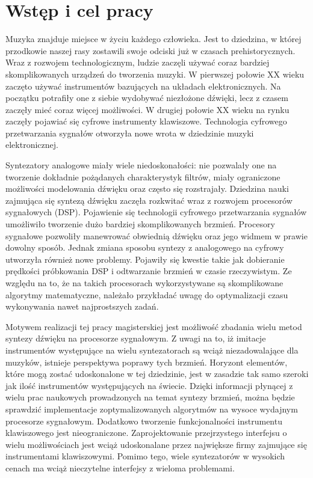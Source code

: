 \chapter{Wstęp i cel pracy}
Muzyka znajduje miejsce w życiu każdego człowieka. Jest to dziedzina, w której przodkowie naszej rasy zostawili swoje odciski już w czasach prehistorycznych. Wraz z rozwojem technologicznym, ludzie zaczęli używać coraz bardziej skomplikowanych urządzeń do tworzenia muzyki. W pierwszej połowie XX wieku zaczęto używać instrumentów bazujących na układach elektronicznych. Na początku potrafiły one z siebie wydobywać niezłożone dźwięki, lecz z czasem zaczęły mieć coraz więcej możliwości. W drugiej połowie XX wieku na rynku zaczęły pojawiać się cyfrowe instrumenty klawiszowe. Technologia cyfrowego przetwarzania sygnałów otworzyła nowe wrota w dziedzinie muzyki elektronicznej.

Syntezatory analogowe miały wiele niedoskonałości: nie pozwalały one na tworzenie dokładnie pożądanych charakterystyk filtrów, miały ograniczone możliwości modelowania dźwięku oraz często się rozstrajały. Dziedzina nauki zajmująca się syntezą dźwięku zaczęła rozkwitać wraz z rozwojem procesorów sygnałowych (DSP). Pojawienie się technologii cyfrowego przetwarzania sygnałów umożliwiło tworzenie dużo bardziej skomplikowanych brzmień. Procesory sygnałowe pozwoliły manewrować obwiednią dźwięku oraz jego widmem w prawie dowolny sposób. Jednak zmiana sposobu syntezy z analogowego na cyfrowy utworzyła również nowe problemy. Pojawiły się kwestie takie jak dobieranie prędkości próbkowania DSP i odtwarzanie brzmień w czasie rzeczywistym. Ze względu na to, że na takich procesorach wykorzystywane są skomplikowane algorytmy matematyczne, należało przykładać uwagę do optymalizacji czasu wykonywania nawet najprostszych zadań.

Motywem realizacji tej pracy magisterskiej jest możliwość zbadania wielu metod syntezy dźwięku na procesorze sygnałowym. Z uwagi na to, iż imitacje instrumentów występujące na wielu syntezatorach są wciąż niezadowalające dla muzyków, istnieje perspektywa poprawy tych brzmień. Horyzont elementów, które mogą zostać udoskonalone w tej dziedzinie, jest w zasadzie tak samo szeroki jak ilość instrumentów występujących na świecie. Dzięki informacji płynącej z wielu prac naukowych prowadzonych na temat syntezy brzmień, można będzie sprawdzić implementacje zoptymalizowanych algorytmów na wysoce wydajnym procesorze sygnałowym. Dodatkowo tworzenie funkcjonalności instrumentu klawiszowego jest nieograniczone. Zaprojektowanie przejrzystego interfejsu o wielu możliwościach jest wciąż udoskonalane przez największe firmy zajmujące się instrumentami klawiszowymi. Pomimo tego, wiele syntezatorów w wysokich cenach ma wciąż nieczytelne interfejsy z wieloma problemami.

